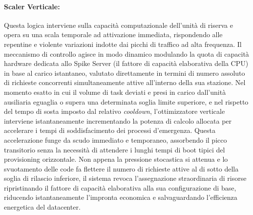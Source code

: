﻿\documentclass[a4paper,12pt]{article}
\begin{document}
\paragraph{Scaler Verticale:}
Questa logica interviene sulla capacità computazionale dell'unità di riserva e opera su una scala temporale ad attivazione immediata, rispondendo alle repentine e violente variazioni indotte dai picchi di traffico ad alta frequenza. Il meccanismo di controllo agisce in modo dinamico modulando la quota di capacità hardware dedicata allo Spike Server (il fattore di capacità elaborativa della CPU) in base al carico istantaneo, valutato direttamente in termini di numero assoluto di richieste concorrenti simultaneamente attive all'interno della sua stazione. Nel momento esatto in cui il volume di task deviati e presi in carico dall'unità ausiliaria eguaglia o supera una determinata soglia limite superiore, e nel rispetto del tempo di sosta imposto dal relativo \textit{cooldown}, l'ottimizzatore verticale interviene istantaneamente incrementando la potenza di calcolo allocata per accelerare i tempi di soddisfacimento dei processi d'emergenza. Questa accelerazione funge da scudo immediato e temporaneo, assorbendo il picco transitorio senza la necessità di attendere i lunghi tempi di boot tipici del provisioning orizzontale. Non appena la pressione stocastica si attenua e lo svuotamento delle code fa flettere il numero di richieste attive al di sotto della soglia di rilascio inferiore, il sistema revoca l'assegnazione straordinaria di risorse ripristinando il fattore di capacità elaborativa alla sua configurazione di base, riducendo istantaneamente l'impronta economica e salvaguardando l'efficienza energetica del datacenter.
\end{document}
